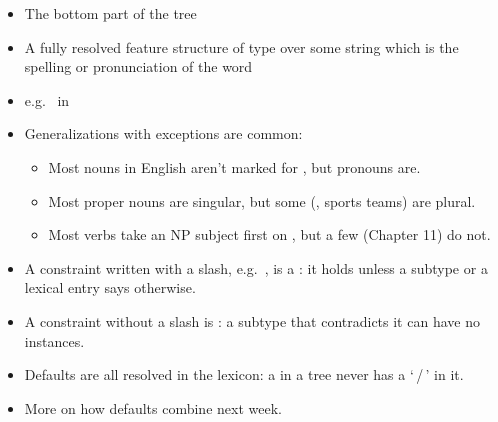 \documentclass[a4paper,landscape,headrule,footrule]{foils}
\begin{document}
\begin{minipage}[c]{0.5\textwidth}
\begin{itemize}
\item The bottom part of the tree
\item A fully resolved feature structure of type  over some
  string which is the spelling or pronunciation of the word
\item e.g.\  in 
\end{itemize}
\end{minipage}%
\begin{minipage}[c]{0.45\textwidth}
\begin{center}
\end{center}
\end{minipage}


\begin{itemize}
\item Generalizations with exceptions are common:
  \begin{itemize}
  \item Most nouns in English aren't marked for , but
    pronouns are.
  \item Most proper nouns are singular, but some (,
    sports teams) are plural.
  \item Most verbs take an NP subject first on , but a few
    (Chapter 11) do not.
  \end{itemize}
\item A constraint written with a slash, e.g.\ \avm{[ num & / sg ]},
  is a : it holds unless a subtype or a lexical entry
  says otherwise.
\item A constraint without a slash is : a subtype
  that contradicts it can have no instances.
\item Defaults are all resolved in the lexicon: a  in a
  tree never has a `\,/\,' in it.
\item More on how defaults combine next week.
\end{itemize}
\end{document}
